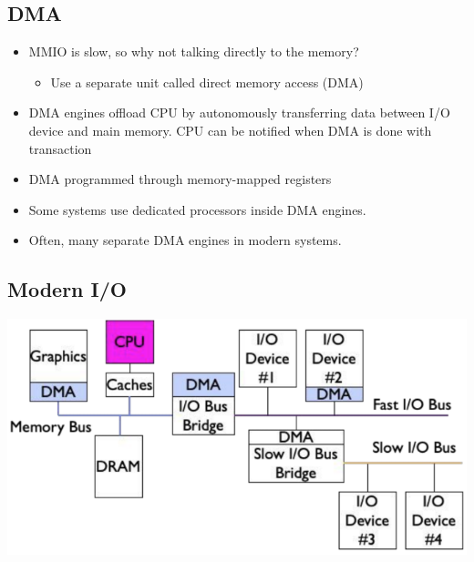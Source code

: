 \documentclass[10pt]{article}
\begin{document}
\subsection*{DMA}
\begin{itemize}
    \item MMIO is slow, so why not talking directly to the memory?
    \begin{itemize}
        \item Use a separate unit called direct memory access (DMA)
    \end{itemize}
    \item DMA engines offload CPU by autonomously transferring data between I/O device and main memory.  CPU can be notified when DMA is done with transaction
    \item DMA programmed through memory-mapped registers
    \item Some systems use dedicated processors inside DMA engines.
    \item Often, many separate DMA engines in modern systems.
\end{itemize}

\subsection*{Modern I/O}
\begin{center}
    \includegraphics[scale=0.7]{W10_3.png}
\end{center}
\end{document}
